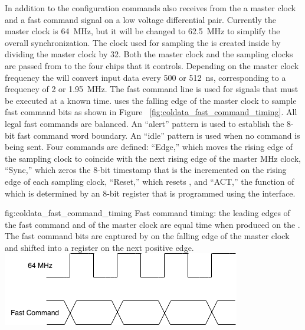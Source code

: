 In addition to the configuration commands  also receives from
the  a master clock and a fast command signal on a low voltage 
differential pair. Currently the master clock is \SI{64}{MHz}, but it will be
changed to \SI{62.5}{MHz} to simplify the overall   
synchronization. The clock used for sampling the  is created inside
 by dividing the master clock by 32. Both the master clock and
the  sampling clocks are passed from  to the four
 chips that it controls. Depending on the master clock frequency
the  will convert input data every \num{500} or \SI{512}{ns}, 
corresponding to a frequency of \num{2} or \SI{1.95}{MHz}. The fast command 
line is used for signals that must be executed at a known time.  
uses the falling edge of the master clock to sample fast command bits as shown 
in Figure ~\ref{fig:coldata_fast_command_timing}. All legal fast commands 
are  balanced. An ``alert'' pattern is used to establish the 8-bit 
fast command word boundary. An ``idle'' pattern is used when no command is being 
sent. Four commands are defined: ``Edge,'' which moves the rising edge of the 
 sampling clock to coincide with the next rising edge of the 
master MHz clock, ``Sync,'' which zeros the 8-bit timestamp that is the incremented 
on the rising edge of each  sampling clock, ``Reset,'' which resets 
, and ``ACT,'' the function of which is determined by an 8-bit 
register that is programmed using the  interface.  

\begin{dunefigure}
{fig:coldata_fast_command_timing}
{Fast command timing: the leading edges of the fast command and of the master 
clock are equal time when produced on the . The fast command bits 
are captured by  on the falling edge of the master clock and 
shifted into a register on the next positive edge.}
\includegraphics[width=0.4\linewidth]{graphics/coldata_clockandfastcommand.png}
\end{dunefigure}

